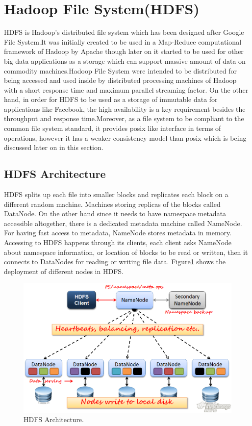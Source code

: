 
\section{Hadoop File System(HDFS)}
 HDFS  is   Hadoop’s   distributed  file  system   which  has   been  designed  after  Google  File System.It was initially created to be used in a Map-Reduce computational framework of Hadoop by Apache though later on it started to be used for other big data applications as a storage which can support massive amount of data on commodity machines.Hadoop File System were intended to be distributed for being accessed and used inside by distributed processing machines of Hadoop with a short response time and maximum parallel streaming factor. On the other hand, in order for HDFS to be used as a storage of immutable data for applications like Facebook, the high availability is a key requirement besides the throughput and response time.Moreover, as a file system to be compliant to the common file system standard, it provides posix like interface in terms of operations, however it has a weaker consistency model than posix which is being discussed later on in this section.
 \subsection{HDFS Architecture}
HDFS  splits   up  each  file  into  smaller  blocks  and replicates  each block  on a different random
machine.  Machines   storing  replicas   of  the  blocks   called  DataNode. On the other hand since
it  needs   to  have  namespace  metadata  accessible  altogether,  there  is   a  dedicated metadata
machine  called  NameNode.  For  having  fast  access   to  metadata,  NameNode  stores
metadata  in  memory.  Accessing  to  HDFS  happens   through  its   clients,  each  client  asks
NameNode  about  namespace  information,  or  location  of  blocks   to  be  read  or  written, then it
connects   to  DataNodes   for  reading  or  writing  file  data.  Figure\ref{fig:HDFS_Architecture}  shows   the  deployment  of
different nodes in HDFS.
\begin{figure}[htb]
  \centering
 \includegraphics[scale=0.5]{figs/preliminar/HDFS_Architecture.png}
  \caption{HDFS Architecture.}
  \label{fig:HDFS_Architecture}
\end{figure}
